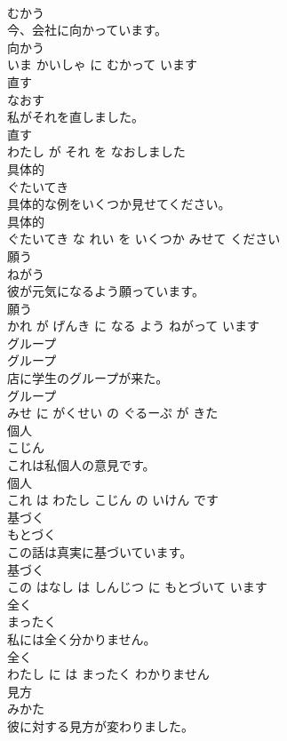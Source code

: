 \documentclass[8pt]{extreport}
\begin{document}
\begin{CJK}{UTF8}{min}
\\	むかう			
\\	今、会社に向かっています。	
\\	向かう 
\\	いま かいしゃ に むかって います			
\\	直す	
\\	なおす			
\\	私がそれを直しました。	
\\	直す 
\\	わたし が それ を なおしました			
\\	具体的	
\\	ぐたいてき			
\\	具体的な例をいくつか見せてください。	
\\	具体的 
\\	ぐたいてき な れい を いくつか みせて ください			
\\	願う	
\\	ねがう			
\\	彼が元気になるよう願っています。	
\\	願う 
\\	かれ が げんき に なる よう ねがって います			
\\	グループ	
\\	グループ			
\\	店に学生のグループが来た。	
\\	グループ 
\\	みせ に がくせい の ぐるーぷ が きた			
\\	個人	
\\	こじん			
\\	これは私個人の意見です。	
\\	個人 
\\	これ は わたし こじん の いけん です			
\\	基づく	
\\	もとづく			
\\	この話は真実に基づいています。	
\\	基づく 
\\	この はなし は しんじつ に もとづいて います			
\\	全く	
\\	まったく			
\\	私には全く分かりません。	
\\	全く 
\\	わたし に は まったく わかりません			
\\	見方	
\\	みかた			
\\	彼に対する見方が変わりました。	

\end{CJK}
\end{document}
